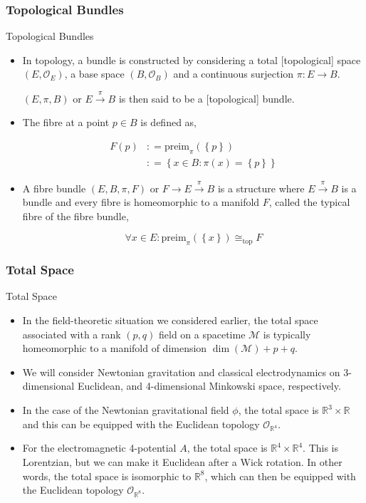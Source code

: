 \documentclass[9pt,handout]{beamer}
\begin{document}
\subsubsection{Topological Bundles}
\begin{frame}{Topological Bundles}
\begin{itemize}
\item In topology, a bundle is constructed by considering a total [topological] space $\left( E, \mathcal{O}_{E} \right)$, a base space $\left( B, \mathcal{O}_{B} \right)$ and a continuous surjection $\pi : E \to B$.

$\left( E, \pi, B \right)$ or $E \overset{\pi}{\to} B$ is then said to be a [topological] bundle.

\item The fibre at a point $p \in B$ is defined as,

\begin{align*}
F \left( p \right) & : = \text{preim}_{\pi} \left( \left\{ p \right\} \right) \\
& : = \left\{ x \in B : \pi \left( x \right) = \left\{ p \right\} \right\}
\end{align*}

\item A fibre bundle $\left( E, B, \pi, F \right)$ or $F \to E \overset{\pi}{\to} B$ is a structure where $E \overset{\pi}{\to} B$ is a bundle and every fibre is homeomorphic to a manifold $F$, called the typical fibre of the fibre bundle,

$$\forall x \in E : \text{preim}_{\pi} \left( \left\{ x \right\} \right) \cong_{\text{top}} F$$
\end{itemize}
\end{frame}

\subsubsection{Total Space}
\begin{frame}{Total Space}
\begin{itemize}
\item In the field-theoretic situation we considered earlier, the total space associated with a rank $\left( p, q \right)$ field on a spacetime $\mathcal{M}$ is typically homeomorphic to a manifold of dimension $\dim \left( \mathcal{M} \right) + p + q$.
\item We will consider Newtonian gravitation and classical electrodynamics on 3-dimensional Euclidean, and 4-dimensional Minkowski space, respectively. 
\item In the case of the Newtonian gravitational field $\phi$, the total space is $\mathbb{R}^3 \times \mathbb{R}$ and this can be equipped with the Euclidean topology $\mathcal{O}_{\mathbb{R}^4}$.
\item For the electromagnetic 4-potential $A$, the total space is $\mathbb{R}^4 \times \mathbb{R}^4$. This is Lorentzian, but we can make it Euclidean after a Wick rotation. In other words, the total space is isomorphic to $\mathbb{R}^8$, which can then be equipped with the Euclidean topology $\mathcal{O}_{\mathbb{R}^8}$.
\end{itemize}
\end{frame}
\end{document}
